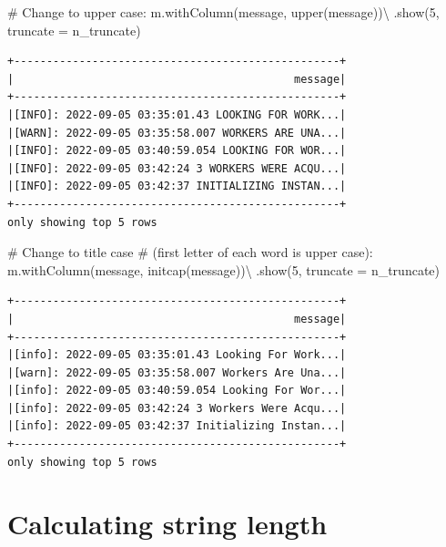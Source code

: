 \documentclass[
  11pt,
  letterpaper,
  DIV=11,
  numbers=noendperiod]{scrreprt}
\newenvironment{Shaded}{\begin{snugshade}}{\end{snugshade}}
\newcommand{\CommentTok}[1]{\textcolor[rgb]{0.37,0.37,0.37}{#1}}
\newcommand{\DecValTok}[1]{\textcolor[rgb]{0.68,0.00,0.00}{#1}}
\newcommand{\NormalTok}[1]{\textcolor[rgb]{0.00,0.23,0.31}{#1}}
\newcommand{\OperatorTok}[1]{\textcolor[rgb]{0.37,0.37,0.37}{#1}}
\newcommand{\StringTok}[1]{\textcolor[rgb]{0.13,0.47,0.30}{#1}}
\begin{document}
\begin{Shaded}
\begin{Highlighting}[]
\CommentTok{\# Change to upper case:}
\NormalTok{m.withColumn(}\StringTok{\textquotesingle{}message\textquotesingle{}}\NormalTok{, upper(}\StringTok{\textquotesingle{}message\textquotesingle{}}\NormalTok{))}\OperatorTok{\textbackslash{}}
\NormalTok{    .show(}\DecValTok{5}\NormalTok{, truncate }\OperatorTok{=}\NormalTok{ n\_truncate)}
\end{Highlighting}
\end{Shaded}

\begin{verbatim}
+--------------------------------------------------+
|                                           message|
+--------------------------------------------------+
|[INFO]: 2022-09-05 03:35:01.43 LOOKING FOR WORK...|
|[WARN]: 2022-09-05 03:35:58.007 WORKERS ARE UNA...|
|[INFO]: 2022-09-05 03:40:59.054 LOOKING FOR WOR...|
|[INFO]: 2022-09-05 03:42:24 3 WORKERS WERE ACQU...|
|[INFO]: 2022-09-05 03:42:37 INITIALIZING INSTAN...|
+--------------------------------------------------+
only showing top 5 rows
\end{verbatim}

\begin{Shaded}
\begin{Highlighting}[]
\CommentTok{\# Change to title case}
\CommentTok{\# (first letter of each word is upper case):}
\NormalTok{m.withColumn(}\StringTok{\textquotesingle{}message\textquotesingle{}}\NormalTok{, initcap(}\StringTok{\textquotesingle{}message\textquotesingle{}}\NormalTok{))}\OperatorTok{\textbackslash{}}
\NormalTok{    .show(}\DecValTok{5}\NormalTok{, truncate }\OperatorTok{=}\NormalTok{ n\_truncate)}
\end{Highlighting}
\end{Shaded}

\begin{verbatim}
+--------------------------------------------------+
|                                           message|
+--------------------------------------------------+
|[info]: 2022-09-05 03:35:01.43 Looking For Work...|
|[warn]: 2022-09-05 03:35:58.007 Workers Are Una...|
|[info]: 2022-09-05 03:40:59.054 Looking For Wor...|
|[info]: 2022-09-05 03:42:24 3 Workers Were Acqu...|
|[info]: 2022-09-05 03:42:37 Initializing Instan...|
+--------------------------------------------------+
only showing top 5 rows
\end{verbatim}

\hypertarget{calculating-string-length}{%
\section{Calculating string length}\label{calculating-string-length}}
\end{document}
